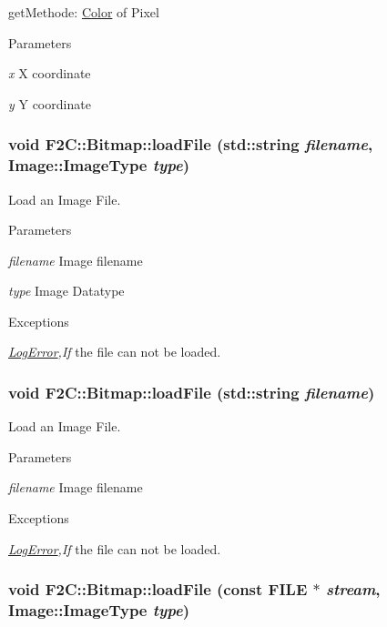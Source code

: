 getMethode: \hyperlink{class_f2_c_1_1_color}{Color} of Pixel 
\begin{DoxyParams}{Parameters}
\item[{\em x}]X coordinate \item[{\em y}]Y coordinate \end{DoxyParams}
\hypertarget{class_f2_c_1_1_bitmap_a7de46ee1b228de65b7ef22021ccff4d5}{
\subsubsection[{loadFile}]{\setlength{\rightskip}{0pt plus 5cm}void F2C::Bitmap::loadFile (std::string {\em filename}, \/  Image::ImageType {\em type})}}
\label{class_f2_c_1_1_bitmap_a7de46ee1b228de65b7ef22021ccff4d5}


Load an Image File. 
\begin{DoxyParams}{Parameters}
\item[{\em filename}]Image filename \item[{\em type}]Image Datatype \end{DoxyParams}

\begin{DoxyExceptions}{Exceptions}
\item[{\em \hyperlink{class_f2_c_1_1_log_error}{LogError},If}]the file can not be loaded. \end{DoxyExceptions}
\hypertarget{class_f2_c_1_1_bitmap_a9f318b926d8175b19038aef999d24ce4}{
\subsubsection[{loadFile}]{\setlength{\rightskip}{0pt plus 5cm}void F2C::Bitmap::loadFile (std::string {\em filename})}}
\label{class_f2_c_1_1_bitmap_a9f318b926d8175b19038aef999d24ce4}


Load an Image File. 
\begin{DoxyParams}{Parameters}
\item[{\em filename}]Image filename \end{DoxyParams}

\begin{DoxyExceptions}{Exceptions}
\item[{\em \hyperlink{class_f2_c_1_1_log_error}{LogError},If}]the file can not be loaded. \end{DoxyExceptions}
\hypertarget{class_f2_c_1_1_bitmap_ab33a63a6dbc66a0792801c92930d1bfd}{
\subsubsection[{loadFile}]{\setlength{\rightskip}{0pt plus 5cm}void F2C::Bitmap::loadFile (const FILE $\ast$ {\em stream}, \/  Image::ImageType {\em type})}}
\label{class_f2_c_1_1_bitmap_ab33a63a6dbc66a0792801c92930d1bfd}


